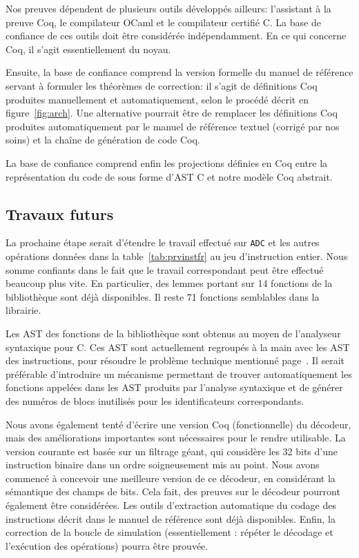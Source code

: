 Nos preuves dépendent de plusieurs outils développés ailleurs:
l'assistant à la preuve Coq,
le compilateur OCaml et le compilateur certifié \compcert C.
La base de confiance de ces outils doit être considérée indépendamment.
En ce qui concerne Coq, il s'agit essentiellement du noyau.

Ensuite, la base de confiance comprend la version formelle
du manuel de référence servant à formuler les théorèmes
de correction:
il s'agit de définitions Coq produites manuellement et automatiquement,
selon le procédé décrit en figure~\ref{fig:arch}.
Une alternative pourrait être de remplacer les définitions Coq produites
automatiquement par le manuel de référence textuel (corrigé par nos soins)
et la chaîne de génération de code Coq.

La base de confiance comprend enfin
les projections définies en Coq entre la représentation du code
de \simlight sous forme d'AST \compcert C
et notre modèle Coq abstrait.

\subsection*{Travaux futurs}

La prochaine étape serait d'étendre le travail effectué sur
\texttt{ADC} et les autres opérations données dans la table~\ref{tab:prvinstfr}
au jeu d'instruction entier.
Nous somme confiants dans le fait que le travail correspondant peut être effectué
beaucoup plus vite.
En particulier, des lemmes portant sur 14 fonctions de la bibliothèque
sont déjà disponibles.
Il reste 71 fonctions semblables dans la librairie.

Les AST des fonctions de la bibliothèque sont obtenus au moyen de l'analyseur
syntaxique pour \compcert C.
Ces AST sont actuellement regroupés à la main avec les AST des instructions,
pour résoudre le problème technique mentionné page~\pageref{page:libfunast}.
Il serait préférable d'introduire un mécanisme permettant
de trouver automatiquement les fonctions appelées dans les AST produits
par l'analyse syntaxique et de générer des numéros de blocs inutilisés
pour les identificateurs correspondants.

Nous avons également tenté d'écrire une version Coq (fonctionnelle)
du décodeur,
mais des améliorations importantes sont nécessaires pour le rendre utilisable.
La version courante est basée sur un filtrage géant,
qui considère les 32 bits d'une instruction binaire
dans un ordre soigneusement mis au point.
Nous avons commencé à concevoir une meilleure version de ce décodeur,
en considérant la sémantique des champs de bits.
%
Cela fait, des preuves sur le décodeur pourront également être considérées.
Les outils d'extraction automatique du codage des instructions décrit dans
le manuel de référence sont déjà disponibles.
%
Enfin, la correction de la boucle de simulation
(essentiellement : répéter le décodage et l'exécution des opérations)
pourra être prouvée.

